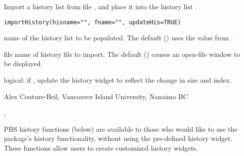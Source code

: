 \documentclass[letterpaper]{book}
\begin{document}
%
\begin{Description}\relax
Import a history list from file , and place it 
into the history list .
\end{Description}
%
\begin{Usage}
\begin{verbatim}
importHistory(hisname="", fname="", updateHis=TRUE)
\end{verbatim}
\end{Usage}
%
\begin{Arguments}
\begin{ldescription}
\item[\code{hisname}] name of the history list to be populated. 
The default () uses the value from .
\item[\code{fname}] file name of history file to import. 
The default () causes an open-file window to be displayed.
\item[\code{updateHis}] logical: if , update the history widget to reflect the change
in size and index.
\end{ldescription}
\end{Arguments}
%
\begin{Author}\relax
Alex Couture-Beil, Vancouver Island University, Nanaimo BC
\end{Author}
%
\begin{SeeAlso}\relax
{}, 
\end{SeeAlso}
%
\begin{Description}\relax
PBS history functions (below) are available to those who would like to 
use the package's history functionality, without using the pre-defined history widget. 
These functions allow users to create customized history widgets.
\end{Description}
\end{document}
